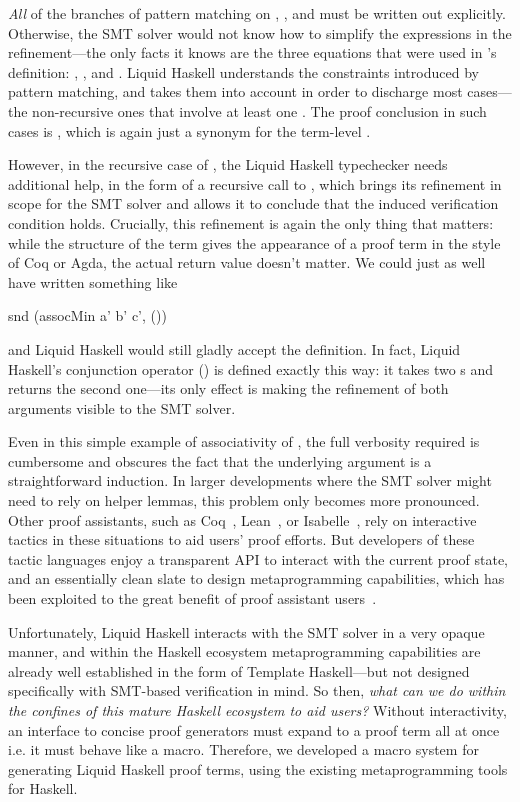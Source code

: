 {\em All} of the branches of pattern matching on , , and
 must be written out explicitly. Otherwise, the SMT solver would
not know how to simplify the  expressions in the
refinement---the only facts it knows are the three equations that were
used in 's definition:
%
, , and
%
.
%
Liquid Haskell understands the constraints introduced by pattern
matching, and takes them into account in order to discharge most
cases---the non-recursive ones that involve at least one . The
proof conclusion in such cases is , which is again just a
synonym for the term-level \LC{()}.

However, in the recursive case of , the Liquid Haskell typechecker needs
additional help, in the form of a recursive call to , which
brings its refinement in scope for the SMT solver and allows it to conclude that
the induced verification condition holds. Crucially, this refinement is again the
only thing that matters: while the structure of the term gives the appearance
of a proof term in the style of Coq or Agda, the actual return value doesn't matter.
We could just as well have written something like
\begin{code}
  snd (assocMin a' b' c', ())
\end{code}
and Liquid Haskell would still gladly accept the definition. In fact,
Liquid Haskell's conjunction operator (\LC{&&&}) is defined exactly
this way: it takes two s and returns the second one---its
only effect is making the refinement of both arguments visible to the SMT solver.

Even in this simple example of associativity of , the full
verbosity required is cumbersome and obscures the fact that the
underlying argument is a straightforward induction. In larger
developments where the SMT solver might need to rely on helper lemmas,
this problem only becomes more pronounced.  Other proof assistants,
such as Coq~\cite{Coq}, Lean~\cite{Lean4}, or
Isabelle~\cite{Isabelle}, rely on interactive tactics in these
situations to aid users' proof efforts. But developers of these tactic
languages enjoy a transparent API to interact with the current proof
state, and an essentially clean slate to design metaprogramming
capabilities, which has been exploited to the great benefit of proof
assistant users~\cite{Ltac, Mtac, ltac2}.

Unfortunately, Liquid Haskell interacts with the SMT solver in a very
opaque manner, and within the Haskell ecosystem metaprogramming
capabilities are already well established in the form of Template
Haskell---but not designed specifically with SMT-based verification in
mind. So then, {\em what can we do within the confines of this mature
  Haskell ecosystem to aid users?}  Without interactivity, an
interface to concise proof generators must expand to a proof term all
at once i.e. it must behave like a macro. Therefore, we developed a
macro system for generating Liquid Haskell proof terms, using the
existing metaprogramming tools for Haskell.

